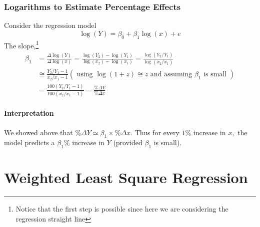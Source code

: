 \documentclass[10pt]{article}
\begin{document}
\subsubsection{Logarithms to Estimate Percentage Effects}
Consider the regression model
\begin{equation*}
    \log (Y)=\beta_{0}+\beta_{1} \log (x)+e
\end{equation*}
The slope,\footnote{Notice that the first step is possible since here we are considering the regression straight line}
\begin{align*}
    \beta_{1} &=\frac{\Delta \log (Y)}{\Delta \log (x)} =\frac{\log \left(Y_{2}\right)-\log \left(Y_{1}\right)}{\log \left(x_{2}\right)-\log \left(x_{1}\right)}
    =\frac{\log \left(Y_{2} / Y_{1}\right)}{\log \left(x_{2} / x_{1}\right)} \\
    &\cong \frac{Y_{2} / Y_{1}-1}{x_{2} / x_{1}-1}\left(\text { using } \log (1+z) \cong z \text { and assuming } \beta_{1} \text { is small }\right) \\
    &=\frac{100\left(Y_{2} / Y_{1}-1\right)}{100\left(x_{2} / x_{1}-1\right)} =\frac{\% \Delta Y}{\% \Delta x}
\end{align*}

\paragraph{Interpretation} We showed above that $\% \Delta Y \simeq \beta_{1} \times \% \Delta x$. Thus for every \(1 \%\) increase in \(x,\) the model predicts a \(\beta_{1} \%\) increase in \(Y\) (provided
\(\beta_{1}\) is small).


\section{Weighted Least Square Regression}
\end{document}

